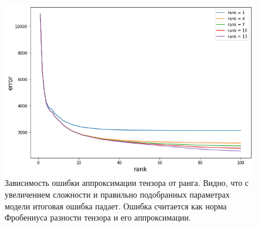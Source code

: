 \documentclass[14pt]{extarticle}
\begin{document}
\begin{figure}[H]
        \centering
        \includegraphics[width=1\textwidth]{exp_1.png}
        
        \caption{Зависимость ошибки аппроксимации тензора от ранга. Видно, что с увеличением сложности и правильно подобранных параметрах модели итоговая ошибка падает. Ошибка считается как норма Фробениуса разности тензора и его аппроксимации.}
        \label{fig_3}
\end{figure}
\end{document}
